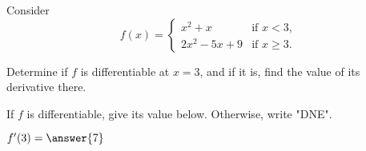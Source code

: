 \documentclass{ximera}
\author{Steven Gubkin}
\begin{document}
\begin{exercise}



Consider 
\[
f(x) = \begin{cases} 
	x^2+x &\text{if  $x<3$,}\\
	2x^2-5x+9 &\text{if $x \geq 3$.}
\end{cases}
\]


Determine if $f$ is differentiable at $x=3$, and if it is, find the value of its derivative there.

\begin{prompt}
	If $f$ is differentiable, give its value below.  Otherwise, write "DNE".
	
	$f'(3) = \answer{7}$
\end{prompt}

\end{exercise}
\end{document}
